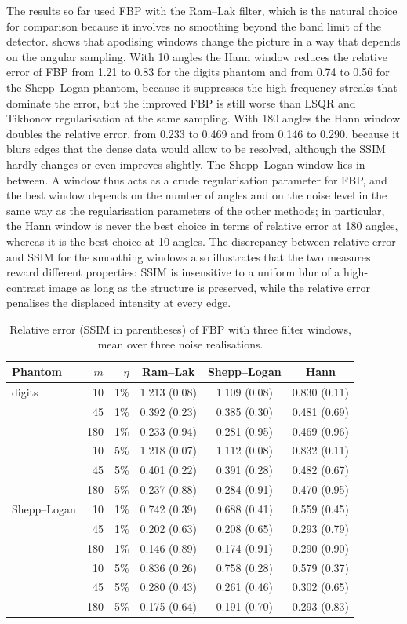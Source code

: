 \documentclass[11pt,a4paper]{article}
\numberwithin{equation}{section}
\theoremstyle{remark}
\begin{document}
The results so far used FBP with the Ram--Lak filter, which is the natural choice for comparison because it involves no smoothing beyond the band limit of the detector.  shows that apodising windows change the picture in a way that depends on the angular sampling. With 10 angles the Hann window reduces the relative error of FBP from 1.21 to 0.83 for the digits phantom and from 0.74 to 0.56 for the Shepp--Logan phantom, because it suppresses the high-frequency streaks that dominate the error, but the improved FBP is still worse than LSQR and Tikhonov regularisation at the same sampling. With 180 angles the Hann window doubles the relative error, from 0.233 to 0.469 and from 0.146 to 0.290, because it blurs edges that the dense data would allow to be resolved, although the SSIM hardly changes or even improves slightly. The Shepp--Logan window lies in between. A window thus acts as a crude regularisation parameter for FBP, and the best window depends on the number of angles and on the noise level in the same way as the regularisation parameters of the other methods; in particular, the Hann window is never the best choice in terms of relative error at 180 angles, whereas it is the best choice at 10 angles. The discrepancy between relative error and SSIM for the smoothing windows also illustrates that the two measures reward different properties: SSIM is insensitive to a uniform blur of a high-contrast image as long as the structure is preserved, while the relative error penalises the displaced intensity at every edge.

\begin{table}[t]
\centering
\caption{Relative error (SSIM in parentheses) of FBP with three filter windows, mean over three noise realisations.}\label{tab:windows}
\small
\begin{tabular}{lrr ccc}
\toprule
Phantom & $m$ & $\eta$ & Ram--Lak & Shepp--Logan & Hann \\
\midrule
digits & 10 & 1\% & 1.213 (0.08) & 1.109 (0.08) & 0.830 (0.11) \\
 & 45 & 1\% & 0.392 (0.23) & 0.385 (0.30) & 0.481 (0.69) \\
 & 180 & 1\% & 0.233 (0.94) & 0.281 (0.95) & 0.469 (0.96) \\
 & 10 & 5\% & 1.218 (0.07) & 1.112 (0.08) & 0.832 (0.11) \\
 & 45 & 5\% & 0.401 (0.22) & 0.391 (0.28) & 0.482 (0.67) \\
 & 180 & 5\% & 0.237 (0.88) & 0.284 (0.91) & 0.470 (0.95) \\
\midrule
Shepp--Logan & 10 & 1\% & 0.742 (0.39) & 0.688 (0.41) & 0.559 (0.45) \\
 & 45 & 1\% & 0.202 (0.63) & 0.208 (0.65) & 0.293 (0.79) \\
 & 180 & 1\% & 0.146 (0.89) & 0.174 (0.91) & 0.290 (0.90) \\
 & 10 & 5\% & 0.836 (0.26) & 0.758 (0.28) & 0.579 (0.37) \\
 & 45 & 5\% & 0.280 (0.43) & 0.261 (0.46) & 0.302 (0.65) \\
 & 180 & 5\% & 0.175 (0.64) & 0.191 (0.70) & 0.293 (0.83) \\
\bottomrule
\end{tabular}
\end{table}
\end{document}
